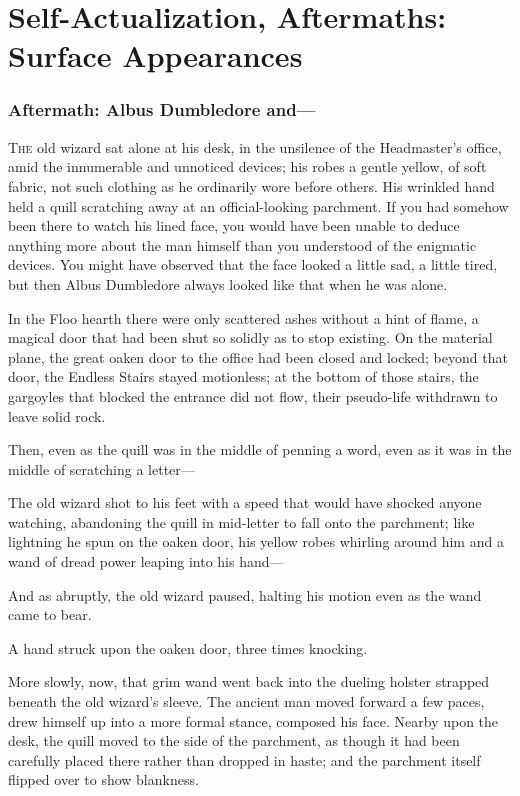 \chapter{Self-Actualization, Aftermaths: Surface Appearances}

\subsection{Aftermath: Albus Dumbledore and---}

\lettrine{T}{he} old wizard sat alone at his desk, in the unsilence of the Headmaster's 
office, amid the innumerable and unnoticed devices; his robes a gentle yellow, 
of soft fabric, not such clothing as he ordinarily wore before others. His 
wrinkled hand held a quill scratching away at an official-looking parchment. If 
you had somehow been there to watch his lined face, you would have been unable 
to deduce anything more about the man himself than you understood of the 
enigmatic devices. You might have observed that the face looked a little sad, a 
little tired, but then Albus Dumbledore always looked like that when he was 
alone.

In the Floo hearth there were only scattered ashes without a hint of flame, a 
magical door that had been shut so solidly as to stop existing. On the material 
plane, the great oaken door to the office had been closed and locked; beyond 
that door, the Endless Stairs stayed motionless; at the bottom of those stairs, 
the gargoyles that blocked the entrance did not flow, their pseudo-life 
withdrawn to leave solid rock.

Then, even as the quill was in the middle of penning a word, even as it was in 
the middle of scratching a letter---

The old wizard shot to his feet with a speed that would have shocked anyone 
watching, abandoning the quill in mid-letter to fall onto the parchment; like 
lightning he spun on the oaken door, his yellow robes whirling around him and a 
wand of dread power leaping into his hand---

And as abruptly, the old wizard paused, halting his motion even as the wand 
came to bear.

A hand struck upon the oaken door, three times knocking.

More slowly, now, that grim wand went back into the dueling holster strapped 
beneath the old wizard's sleeve. The ancient man moved forward a few paces, 
drew himself up into a more formal stance, composed his face. Nearby upon the 
desk, the quill moved to the side of the parchment, as though it had been 
carefully placed there rather than dropped in haste; and the parchment itself 
flipped over to show blankness.

